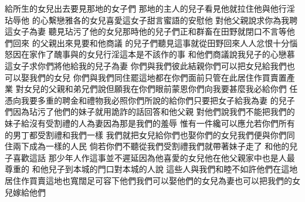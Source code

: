 \bchapter%
給所生的女兒出去\chientien 要見那地的女子們\chuan 
{}那地的主人\chientien{}的兒子\chientien 看見他\chientien 就拉住他\chientien 與他行淫\chientien 玷辱他\chuan 
{}的心繫戀雅各的女兒\chientien 喜愛這女子\chientien 甜言蜜語的安慰他\chuan 
{}對他父親說\chientien 求你為我聘這女子為妻\chuan 
{}聽見玷污了他的女兒\yuentien 那時他的兒子們正和群畜在田野\chientien{}就閉口不言\chientien 等他們回來\chuan 
{}的父親出來見\chientien 要和他商議\chuan 
{}的兒子們聽見這事\chientien 就從田野回來\chientien 人人忿恨\chientien 十分惱怒\chientien 因在家作了醜事\chientien 與的女兒行淫\chientien 這本是不該作的事\chuan 
{}和他們商議說\chientien 我兒子的心戀慕這女子\chientien 求你們將他給我的兒子為妻\chuan 
{}你們與我們彼此結親\chientien 你們可以把女兒給我們\chientien 也可以娶我們的女兒\chuan 
{}你們與我們同住罷\chientien 這地都在你們面前\chientien 只管在此居住\chientien 作買賣\chientien 置產業\chuan 
{}對女兒的父親和弟兄們說\chientien 但願我在你們眼前蒙恩\yuentien 你們向我要甚麼我必給你們\chuan 
{}任憑向我要多重的聘金和禮物\chientien 我必照你們所說的給你們\chientien 只要把女子給我為妻\chuan 
{}的兒子們\chientien 因為玷污了他們的妹子\chientien 就用詭詐的話回答\chientien 和他父親\yuentien 
{}對他們說\chientien 我們不能把我們的妹子給沒有受割禮的人為妻\chientien 因為那是我們的羞辱\yuentien 
{}惟有一件纔可以應允\chientien 若你們所有的男丁都受割禮\chientien 和我們一樣\chientien 
{}我們就把女兒給你們\chientien 也娶你們的女兒\chientien 我們便與你們同住\chientien 兩下成為一樣的人民\chuan 
{}倘若你們不聽從我們受割禮\chientien 我們就帶著妹子走了\chuan\Chuan
{}和他的兒子喜歡這話\chuan 
{}那少年人作這事並不遲延\chientien 因為他喜愛的女兒\yuentien 他在他父親家中也是人最尊重的\chuan 
{}和他兒子到本城的門口\chientien 對本城的人說\chientien 
{}這些人與我們和睦\chientien 不如許他們在這地居住作買賣\yuentien 這地也寬闊\chientien 足可容下他們\chientien 我們可以娶他們的女兒為妻\chientien 也可以把我們的女兒嫁給他們\chuan 
